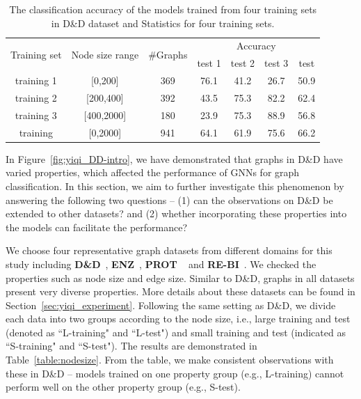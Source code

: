 \documentclass[11pt,dvipdfm]{article}
\begin{document}
\begin{table}[h]
\begin{center}
\begin{minipage}{\textwidth}
\caption{The classification accuracy of the models trained from four training sets in D\&D dataset and  Statistics for four training sets.}\label{tab:ac_on_diff_test}
\begin{tabular*}{\textwidth}{@{\extracolsep{\fill}}ccccccc@{\extracolsep{\fill}}}
\toprule%
\multirow{2}{*}{Training set} & \multirow{2}{*}{Node size range} & \multirow{2}{*}{\#Graphs}  &
\multicolumn{4}{c}{Accuracy} \\ \cline{4-7} 

    &             &        & test 1 & test 2  & test 3 & test \\
\midrule
training 1  &[0,200]  & 369        & 76.1            & 41.2      & 26.7      & 50.9     \\ 
training 2  &[200,400]  & 392          & 43.5            &75.3      & 82.2      & 62.4   \\ 
training 3   &[400,2000]  & 180       &23.9           & 75.3       & 88.9      & 56.8  \\ 
training     &[0,2000]  & 941        & 64.1            & 61.9      & 75.6      & 66.2  \\
\bottomrule
\end{tabular*}

\end{minipage}
\end{center}
\end{table}


In Figure~\ref{fig:yiqi_DD-intro}, we have demonstrated that graphs in D\&D have varied properties, which affected the performance of GNNs for graph classification. In this section, we aim to further investigate this phenomenon by answering the following two questions -- (1) can the observations on D\&D be extended to other datasets? and (2) whether incorporating these properties into the models can facilitate the performance?

We choose four representative graph datasets from different domains for this study including \textbf{D\&D}~\cite{dobson2003distinguishing}, \textbf{ENZ}~\cite{shervashidze2011weisfeiler}, \textbf{PROT} ~\cite{borgwardt2005protein} and \textbf{RE-BI}~\cite{yanardag2015deep}.
We checked the properties such as node size and edge size. Similar to D\&D, graphs in all datasets present very diverse properties. More details about these datasets can be found in Section~\ref{sec:yiqi_experiment}.
Following the same setting as D\&D, we divide each data into two groups according to the node size, i.e., large training and test (denoted as ``L-training" and ``L-test") and small training and test (indicated as ``S-training" and ``S-test"). 
The results are demonstrated in Table~\ref{table:nodesize}. 
From the table, we make consistent observations with these in D\&D -- models trained on one property group (e.g., L-training) cannot perform well on the other property group (e.g., S-test). 
\end{document}
